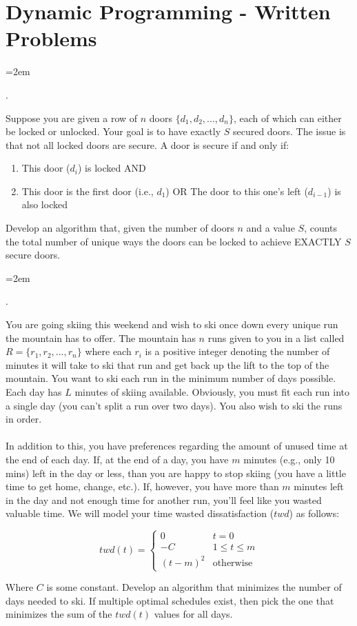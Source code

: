 \documentclass[12pt]{article}
\def\homework{Dynamic Programming - Written Problems}
\newcounter{quesnum}
\newcommand{\question}[2][??]{
\begin{list}{\labelitemi}{\leftmargin=2em}
\item [\arabic{quesnum}.]  {#2}
\end{list}
\addtocounter{quesnum}{1}
}
\newcommand{\answer}[2][??]{ 
\ifthenelse{\boolean{solution}}{
\color{red} #2 \color{black}}
{\vspace*{#1}}
}
\begin{document}
\section*{\homework}



\question[3]{
Suppose you are given a row of $n$ doors $\{d_1,d_2,...,d_n\}$, each of which can either be locked or unlocked. Your goal is to have exactly $S$ secured doors. The issue is that not all locked doors are secure. A door is secure if and only if:

\begin{enumerate}
\item This door ($d_i$) is locked AND
\item This door is the first door (i.e., $d_1$) OR The door to this one's left ($d_{i-1}$) is also locked
\end{enumerate}

Develop an algorithm that, given the number of doors $n$ and a value $S$, counts the total number of unique ways the doors can be locked to achieve EXACTLY $S$ secure doors.
}

\answer[0 in]{
...
}



\question[4]{
You are going skiing this weekend and wish to ski once down every unique run the mountain has to offer. The mountain has $n$ runs given to you in a list called $R = \{r_1,r_2,...,r_n\}$ where each $r_i$ is a positive integer denoting the number of minutes it will take to ski that run and get back up the lift to the top of the mountain. You want to ski each run in the minimum number of days possible. Each day has $L$ minutes of skiing available. Obviously, you must fit each run into a single day (you can't split a run over two days). You also wish to ski the runs in order.\\
\\
In addition to this, you have preferences regarding the amount of unused time at the end of each day. If, at the end of a day, you have $m$ minutes (e.g., only 10 mins) left in the day or less, than you are happy to stop skiing (you have a little time to get home, change, etc.). If, however, you have more than $m$ minutes left in the day and not enough time for another run, you'll feel like you wasted valuable time. We will model your time wasted dissatisfaction ($twd$) as follows:

\begin{displaymath}
twd(t) = \left\{
	\begin{array}{lr}
	0 & t=0\\
	-C & 1 \leq t \leq m\\
	(t-m)^2 & \text{otherwise}
	\end{array}
	\right.
\end{displaymath}

Where $C$ is some constant. Develop an algorithm that minimizes the number of days needed to ski. If multiple optimal schedules exist, then pick the one that minimizes %
the sum of the $twd(t)$ values for all days.
}
\end{document}
